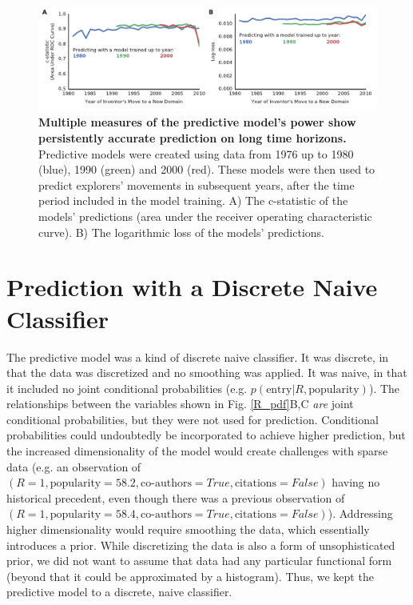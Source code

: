 \documentclass{dsj}
\begin{document}
\begin{figure}%
\includegraphics[width=1.3\textwidth]{figs/prediction_quality_other_measures.pdf} 
\caption{\textbf{Multiple measures of the predictive model's power show persistently accurate prediction on long time horizons.} Predictive models were created using data from 1976 up to 1980 (blue), 1990 (green) and 2000 (red). These models were then used to predict explorers' movements in subsequent years, after the time period included in the model training.  
A) The c-statistic of the models' predictions (area under the receiver operating characteristic curve). 
B) The logarithmic loss of the models' predictions. 
}\label{prediction_quality_other_measures}
\end{figure}



\section{Prediction with a Discrete Naive Classifier}
The predictive model was a kind of discrete naive classifier. It was discrete, in that the data was discretized and no smoothing was applied. It was naive, in that it included no joint conditional probabilities (e.g. $p(\text{entry}|R, \text{popularity})$). The relationships between the variables shown in Fig. \ref{R_pdf}B,C \textit{are} joint conditional probabilities, but they were not used for prediction. Conditional probabilities could undoubtedly be incorporated to achieve higher prediction, but the increased dimensionality of the model would create challenges with sparse data (e.g. an observation of $(R=1, \text{popularity}=58.2, \text{co-authors}=True, \text{citations}=False)$ having no historical precedent, even though there was a previous observation of $(R=1, \text{popularity}=58.4, \text{co-authors}=True, \text{citations}=False)$). Addressing higher dimensionality would require smoothing the data, which essentially introduces a prior. While discretizing the data is also a form of unsophisticated prior, we did not want to assume that data had any particular functional form (beyond that it could be approximated by a histogram). Thus, we kept the predictive model to a discrete, naive classifier.
\cleardoublepage
\end{document}
